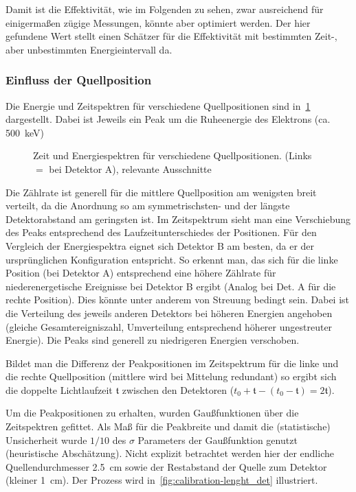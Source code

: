 \documentclass[slug=PET, room=Andreas-Schubert-Bau\,\ 424A, supervisor=Carsten\ Bittrich, coursedate=10.\ 01.\ 2020]{../../Lab_Report_LaTeX/lab_report}
\begin{document}
Damit ist die Effektivit\"at, wie im Folgenden zu sehen, zwar
ausreichend f\"ur einigerma\ss{}en z\"ugige Messungen, k\"onnte aber
optimiert werden. Der hier gefundene Wert stellt einen Sch\"atzer
f\"ur die Effektivit\"at mit bestimmten Zeit-, aber unbestimmten
Energieintervall da.


\subsubsection{Einfluss der Quellposition}
\label{sec:quellpos}

Die Energie und Zeitspektren f\"ur verschiedene Quellpositionen sind
in~\ref{fig:calibration-comp} dargestellt. Dabei ist Jeweils ein Peak
um die Ruheenergie des Elektrons (ca. \SI{500}{\kilo\electronvolt})
\begin{figure}[htb]\centering
  
  \caption[Vergleich der Quellpositionen]{Zeit und Energiespektren f\"ur verschiedene
    Quellpositionen. (Links \(=\) bei Detektor A), relevante Ausschnitte}
  \label{fig:calibration-comp}
\end{figure}

Die Z\"ahlrate ist generell f\"ur die mittlere Quellposition am
wenigsten breit verteilt, da die Anordnung so am symmetrischsten- und
der l\"angste Detektorabstand am geringsten ist. Im Zeitspektrum sieht
man eine Verschiebung des Peaks entsprechend des Laufzeitunterschiedes
der Positionen. F\"ur den Vergleich der Energiespektra eignet sich
Detektor B am besten, da er der urspr\"unglichen Konfiguration
entspricht. So erkennt man, das sich f\"ur die linke Position (bei
Detektor A) entsprechend eine h\"ohere Z\"ahlrate f\"ur
niederenergetische Ereignisse bei Detektor B ergibt (Analog bei Det. A
f\"ur die rechte Position). Dies k\"onnte unter anderem von Streuung
bedingt sein. Dabei ist die Verteilung des jeweils anderen Detektors
bei h\"oheren Energien angehoben (gleiche Gesamtereigniszahl,
Umverteilung entsprechend h\"oherer ungestreuter Energie).  Die Peaks
sind generell zu niedrigeren Energien verschoben.

Bildet man die Differenz der Peakpositionen im Zeitspektrum f\"ur die
linke und die rechte Quellposition (mittlere wird bei Mittelung
redundant) so ergibt sich die doppelte Lichtlaufzeit \(\mathfrak{t}\)
zwischen den Detektoren
(\(t_0 + \mathfrak{t} - (t_0 - \mathfrak{t}) = 2\mathfrak{t}\)).

Um die Peakpositionen zu erhalten, wurden Gaußfunktionen \"uber die
Zeitspektren gefittet. Als Ma\ss{} f\"ur die Peakbreite und damit die
(statistische) Unsicherheit wurde \(1/10\) des \(\sigma\) Parameters
der Gaußfunktion genutzt (heuristische Absch\"atzung). Nicht explizit
betrachtet werden hier der endliche Quellendurchmesser
\SI{2.5}{\centi\meter} sowie der Restabstand der Quelle zum Detektor
(kleiner \SI{1}{\centi\meter}). Der Prozess wird
in~\ref{fig:calibration-lenght_det} illustriert.
\end{document}
